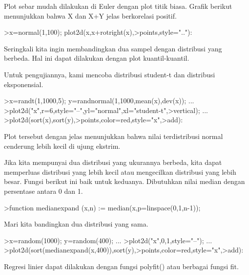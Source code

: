 \documentclass{article}
\begin{document}
\begin{eulernotebook}
\begin{eulercomment}
\begin{eulercomment}
\begin{eulercomment}
Plot sebar mudah dilakukan di Euler dengan plot titik biasa. Grafik
berikut menunjukkan bahwa X dan X+Y jelas berkorelasi positif.
\end{eulercomment}
\begin{eulerprompt}
>x=normal(1,100); plot2d(x,x+rotright(x),>points,style=".."):
\end{eulerprompt}
\begin{eulercomment}
Seringkali kita ingin membandingkan dua sampel dengan distribusi yang
berbeda. Hal ini dapat dilakukan dengan plot kuantil-kuantil.

Untuk pengujiannya, kami mencoba distribusi student-t dan distribusi
eksponensial.
\end{eulercomment}
\begin{eulerprompt}
>x=randt(1,1000,5); y=randnormal(1,1000,mean(x),dev(x)); ...
>plot2d("x",r=6,style="--",yl="normal",xl="student-t",>vertical); ...
>plot2d(sort(x),sort(y),>points,color=red,style="x",>add):
\end{eulerprompt}
\begin{eulercomment}
Plot tersebut dengan jelas menunjukkan bahwa nilai terdistribusi
normal cenderung lebih kecil di ujung ekstrim.

Jika kita mempunyai dua distribusi yang ukurannya berbeda, kita dapat
memperluas distribusi yang lebih kecil atau mengecilkan distribusi
yang lebih besar. Fungsi berikut ini baik untuk keduanya. Dibutuhkan
nilai median dengan persentase antara 0 dan 1.
\end{eulercomment}
\begin{eulerprompt}
>function medianexpand (x,n) := median(x,p=linspace(0,1,n-1));
\end{eulerprompt}
\begin{eulercomment}
Mari kita bandingkan dua distribusi yang sama.
\end{eulercomment}
\begin{eulerprompt}
>x=random(1000); y=random(400); ...
>plot2d("x",0,1,style="--"); ...
>plot2d(sort(medianexpand(x,400)),sort(y),>points,color=red,style="x",>add):
\end{eulerprompt}
\begin{eulercomment}
Regresi linier dapat dilakukan dengan fungsi polyfit() atau berbagai
fungsi fit.


\end{eulercomment}
\end{eulercomment}
\end{eulercomment}
\end{eulernotebook}
\end{document}
